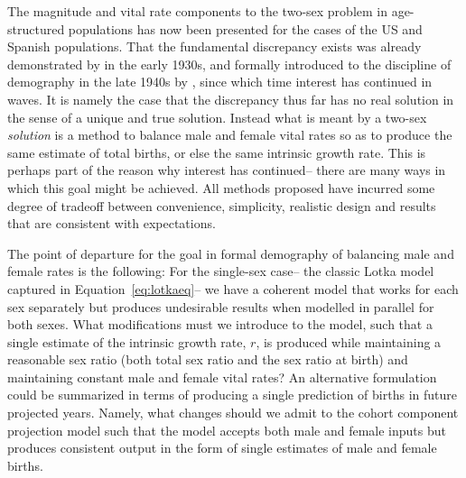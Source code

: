  \FloatBarrier

The magnitude and vital rate components to the two-sex problem in age-structured
populations has now been presented for the cases of the US and Spanish
populations. That the fundamental discrepancy exists was already demonstrated by
\citet{kuczynski1932fertility} in the early 1930s, and formally introduced to
the discipline of demography in the late 1940s by \citet{karmel1947relations},
since which time interest has continued in waves. It is namely the case that the
discrepancy thus far has no real solution in the sense of a unique and true
solution. Instead what is meant by a two-sex \textit{solution} is a method to
balance male and female vital rates so as to produce the same estimate of
total births, or else the same intrinsic growth rate. This is perhaps part of
the reason why interest has continued-- there are many ways in which this goal
might be achieved. All methods proposed have incurred some degree of tradeoff
between convenience, simplicity, realistic design and results that are
consistent with expectations.
 
The point of departure for the goal in formal demography of balancing male and
female rates is the following: For the single-sex case-- the classic Lotka
model captured in Equation~\eqref{eq:lotkaeq}-- we have a coherent model that
works for each sex separately but produces undesirable results when modelled in parallel for both
sexes. What modifications must we introduce to the model, such that a single
estimate of the intrinsic growth rate, $r$, is produced while maintaining a
reasonable sex ratio (both total sex ratio and the sex ratio at birth) and
maintaining constant male and female vital rates? An alternative formulation
could be summarized in terms of producing a single prediction of births in
future projected years. Namely, what changes should we admit to the cohort
component projection model such that the model accepts both male and
female inputs but produces consistent output in the form of single estimates of
male and female births.


 
 
 
 
 
\FloatBarrier